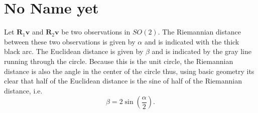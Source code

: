 \begin{center}
\end{center}
\section{No Name yet}
\label{sec:appendix2}
Let $\bm R_1\bm v$ and $\bm R_2\bm v$ be two observations in $SO(2)$.  The Riemannian distance between these two observations is given by $\alpha$ and is indicated with the thick black arc.  The Euclidean distance is given by $\beta$ and is indicated by the gray line running through the circle.  Because this is the unit circle, the Riemannian distance is also the angle in the center of the circle thus, using basic geometry its clear that half of the Euclidean distance is the sine of half of the Riemannian distance, i.e.
\[
\beta=2\sin\left(\frac{\alpha}{2}\right).
\]

